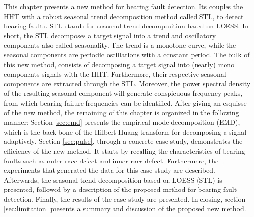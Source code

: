\documentclass[../Main/thesis.tex]{subfiles}
\begin{document}
\justify
This chapter presents a new method for bearing fault detection. Its couples the HHT with a robust seasonal trend decomposition method called STL, to detect bearing faults. STL stands for seasonal trend decomposition based on LOESS. In short, the STL decomposes a target signal into a trend and oscillatory components also called  seasonality. The trend is a monotone curve, while the seasonal components are periodic oscillations with a constant period.
\justify
The bulk of this new method, consists of decomposing a target signal into (nearly) mono components signals with the HHT. Furthermore, their respective seasonal components are extracted through the STL. Moreover, the power spectral density of the resulting seasonal component will generate conspicuous frequency peaks, from which bearing failure frequencies can be identified.
\justify
After giving an esquisse of the new method, the remaining of this chapter is organized in the following manner:
 Section \ref{sec:emd} presents the empirical mode decomposition (EMD), which is the back bone of the Hilbert-Huang transform for decomposing a signal adaptively. Section \ref{sec:pulse}, through a concrete case study, demonstrates the efficiency of the new method. It starts by recalling the characteristics of bearing faults such as outer race defect and inner race defect. Furthermore, the experiments that generated the data for this case study are described. Afterwards, the seasonal trend decomposition based on LOESS (STL) is presented, followed by a description of the proposed method for bearing fault detection. Finally, the results of the case study are presented. In closing, section \ref{sec:limitation} presents a summary and discussion of the proposed new method.
\justify



 
\end{document}
